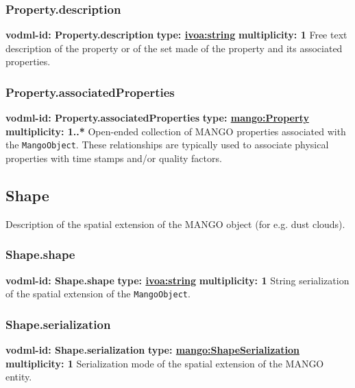     \subsubsection{Property.description}
      \textbf{vodml-id: Property.description} \newline
      \textbf{type: \hyperref[sect:ivoa]{ivoa:string}} \newline
      \textbf{multiplicity: 1} \newline 
      Free text description of the property or of the set made of the property and its associated properties.

    \subsubsection{Property.associatedProperties}
      \textbf{vodml-id: Property.associatedProperties} \newline
      \textbf{type: \hyperref[sect:Property]{mango:Property}} \newline
      \textbf{multiplicity: 1..*} \newline 
      Open-ended collection of MANGO properties associated with the \texttt{MangoObject}. These relationships are typically used to associate physical properties with time stamps and/or quality factors.

  \subsection{Shape}
  \label{sect:Shape}
    Description of the spatial extension of the MANGO object (for e.g. dust clouds).

    \subsubsection{Shape.shape}
      \textbf{vodml-id: Shape.shape} \newline
      \textbf{type: \hyperref[sect:ivoa]{ivoa:string}} \newline
      \textbf{multiplicity: 1} \newline 
      String serialization of the spatial extension of the \texttt{MangoObject}.

    \subsubsection{Shape.serialization}
      \textbf{vodml-id: Shape.serialization} \newline
      \textbf{type: \hyperref[sect:ShapeSerialization]{mango:ShapeSerialization}} \newline
      \textbf{multiplicity: 1} \newline 
      Serialization mode of the spatial extension of the MANGO entity.

